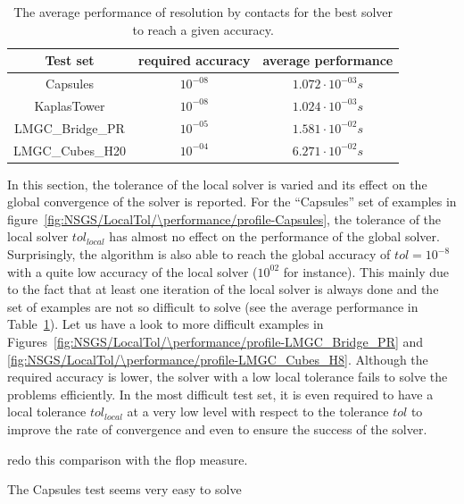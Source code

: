 \begin{table}[htbp]
  \centering
  \begin{tabular}{|c|c|c|}
    \hline
    Test set & required accuracy &  average performance \\
    \hline
    \hline
    Capsules & $10^{-08}$ & $ 1.072 \cdot 10^{-03} s$ \\
    KaplasTower & $10^{-08}$ &  $1.024 \cdot 10^{-03} s$ \\
    LMGC\_Bridge\_PR & $10^{-05}$&$1.581 \cdot 10^{-02} s $ \\
    LMGC\_Cubes\_H20 &$10^{-04}$ &$6.271 \cdot 10^{-02} s $\\
    \hline
  \end{tabular}
  \caption{The average performance of resolution by contacts for the best solver to reach a given accuracy.}
  \label{tab:hardness}
\end{table}



In this section, the tolerance of the local solver is varied and its effect on the global convergence of the solver is reported. For the ``Capsules'' set of examples in figure~\ref{fig:NSGS/LocalTol/\performance/profile-Capsules}, the tolerance of the local solver $tol_{local}$ has almost no effect on the performance of the global solver. Surprisingly, the algorithm is also able to reach the global accuracy of $tol = 10^{-8}$ with a quite low accuracy of the local solver ($10^{02}$ for instance). This mainly due to the fact that at least one iteration of the local solver is always done and the set of examples are not so difficult to solve (see the average performance in Table~\ref{tab:hardness}).
Let us have a look to more difficult examples in Figures~\ref{fig:NSGS/LocalTol/\performance/profile-LMGC_Bridge_PR} and \ref{fig:NSGS/LocalTol/\performance/profile-LMGC_Cubes_H8}. Although the required accuracy is lower, the solver with a low local tolerance fails to solve the problems efficiently. In the most difficult test set, it is even required to have a local tolerance $tol_{local}$ at a very low level with respect to the tolerance $tol$ to improve the rate of convergence and even to ensure the success of the solver.

\begin{ndrva}
  \item redo this comparison with the flop measure.
  \item The Capsules test seems very easy to solve
\end{ndrva}

